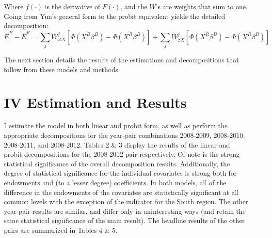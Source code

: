 \documentclass[11pt]{article}
\theoremstyle{definition}
\begin{document}
Where $f(\cdot)$ is the derivative of $F(\cdot)$, and the $W$'s are weights that sum to one.  Going from Yun's general form to the probit equivalent yields the detailed decomposition:
\begin{equation*}
\bar{E}^{B} - \bar{E}^{R} = \sum_{j} W^{j}_{\Delta X} \left[ \overline{\Phi(X^{B}\beta^{B})} - \overline{\Phi(X^{R}\beta^{B})}\right] + \sum_{j} W^{j}_{\beta X} \left[ \overline{\Phi(X^{R}\beta^{B})} - \overline{\Phi(X^{R}\beta^{R})}\right]
\end{equation*}

The next section details the results of the estimations and decompositions that follow from these models and methods.

\section*{IV Estimation and Results}
\indent
\par
I estimate the model in both linear and probit form, as well as perform the appropriate decompositions for the year-pair combinations 2008-2009, 2008-2010, 2008-2011, and 2008-2012.  Tables 2 \& 3 display the results of the linear and probit decompositions for the 2008-2012 pair respectively.  Of note is the strong statistical significance of the overall decomposition results.  Additionally, the degree of statistical significance for the individual covariates is strong both for endowments and (to a lesser degree) coefficients.  In both models, all of the difference in the endowments of the covariates are statistically significant at all common levels with the exception of the indicator for the South region.  The other year-pair results are similar, and differ only in uninteresting ways (and retain the same statistical significance of the main result).  The headline results of the other pairs are summarized in Tables 4 \& 5.  
\end{document}

